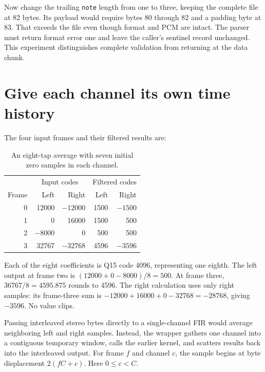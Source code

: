 Now change the trailing \texttt{note} length from one to three, keeping the
complete file at 82 bytes. Its payload would require bytes 80 through 82 and a
padding byte at 83. That exceeds the file even though format and PCM are intact.
The parser must return format error one and leave the caller's sentinel record
unchanged. This experiment distinguishes complete validation from returning
at the data chunk.


\section{Give each channel its own time history}
The four input frames and their filtered results are:
\begin{table}[!ht]
  \centering
  \begin{tabular}{r rr rr}
    \toprule
          & \multicolumn{2}{c}{Input codes} & \multicolumn{2}{c}{Filtered codes}                  \\
    Frame & Left                            & Right                              & Left & Right   \\
    \midrule
    0     & 12000                           & $-12000$                           & 1500 & $-1500$ \\
    1     & 0                               & 16000                              & 1500 & 500     \\
    2     & $-8000$                         & 0                                  & 500  & 500     \\
    3     & 32767                           & $-32768$                           & 4596 & $-3596$ \\
    \bottomrule
  \end{tabular}
  \caption{An eight-tap average with seven initial zero samples in each channel.}
  \label{revision:wav-filter-trace}
\end{table}

Each of the eight coefficients is Q15 code 4096, representing one eighth.
The left output at frame two is $(12000+0-8000)/8=500$. At frame three,
$36767/8=4595.875$ rounds to 4596. The right calculation uses only right
samples: its frame-three sum is $-12000+16000+0-32768=-28768$, giving
$-3596$. No value clips.

Passing interleaved stereo bytes directly to a single-channel FIR would average
neighboring left and right samples. Instead, the wrapper gathers one channel
into a contiguous temporary window, calls the earlier kernel, and scatters
results back into the interleaved output. For frame $f$ and channel $c$, the
sample begins at byte displacement $2(fC+c)$. Here $0\leq c<C$.

